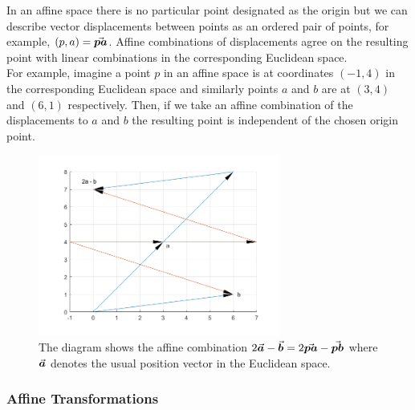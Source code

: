 \documentclass[MathsNotesBase.tex]{subfiles}
\begin{document}
{	\bigskip
	In an affine space there is no particular point designated as the origin but we can describe vector displacements between points as an ordered pair of points, for example, ${ (p,a) = \vec{\bm{pa}} }$. Affine combinations of displacements agree on the resulting point with linear combinations in the corresponding Euclidean space.\\
	For example, imagine a point $p$ in an affine space is at coordinates ${ (-1,4) }$ in the corresponding Euclidean space and similarly points $a$ and $b$ are at ${ (3,4) }$ and ${ (6,1) }$ respectively. Then, if we take an affine combination of the displacements to $a$ and $b$ the resulting point is independent of the chosen origin point.
%	
	
	\begin{figure}[h!]
		\centering
		\includegraphics[width=300px]{resources/img/affine_combinations_example.png}
		\caption{\small The diagram shows the affine combination ${ 2\vec{\bm{a}} - \vec{\bm{b}} = 2\vec{\bm{pa}} - \vec{\bm{pb}} }$ where $\vec{\bm{a}}$ denotes the usual position vector in the Euclidean space.}
		\label{fig:affine_combinations_example}
	\end{figure}

	
	
	\bigskip\bigskip\bigskip
	\subsubsection{Affine Transformations}

}
\end{document}
